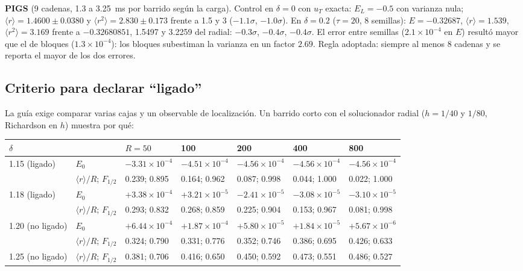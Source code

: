 \documentclass[11pt]{article}
\begin{document}
\textbf{PIGS} (9 cadenas, 1.3 a 3.25~ms por barrido según la carga). Control en $\delta=0$ con $u_T$ exacta: $E_L=-0.5$ con varianza nula; $\langle r\rangle=1.4600\pm0.0380$ y $\langle r^2\rangle=2.830\pm0.173$ frente a 1.5 y 3 ($-1.1\sigma$, $-1.0\sigma$). En $\delta=0.2$ ($\tau=20$, 8 semillas): $E=-0.32687$, $\langle r\rangle=1.539$, $\langle r^2\rangle=3.169$ frente a $-0.32680851$, 1.5497 y 3.2259 del radial: $-0.3\sigma$, $-0.4\sigma$, $-0.4\sigma$. El error entre semillas ($2.1\times10^{-4}$ en $E$) resultó mayor que el de bloques ($1.3\times10^{-4}$): los bloques subestiman la varianza en un factor $2.69$. Regla adoptada: siempre al menos 8 cadenas y se reporta el mayor de los dos errores.

\subsection{Criterio para declarar ``ligado''}
\label{sec:criterio}

La guía exige comparar varias cajas y un observable de localización. Un barrido corto con el solucionador radial ($h=1/40$ y $1/80$, Richardson en $h$) muestra por qué:

\begin{table}[H]
\centering
\small
\begin{tabular}{@{}lllllll@{}}
\toprule
$\delta$ & & $R=50$ & 100 & 200 & 400 & 800\\
\midrule
1.15 (ligado) & $E_0$ & $-3.31\times10^{-4}$ & $-4.51\times10^{-4}$ & $-4.56\times10^{-4}$ & $-4.56\times10^{-4}$ & $-4.56\times10^{-4}$\\
 & $\langle r\rangle/R$; $F_{1/2}$ & 0.239; 0.895 & 0.164; 0.962 & 0.087; 0.998 & 0.044; 1.000 & 0.022; 1.000\\
1.18 (ligado) & $E_0$ & $+3.38\times10^{-4}$ & $+3.21\times10^{-5}$ & $-2.41\times10^{-5}$ & $-3.08\times10^{-5}$ & $-3.10\times10^{-5}$\\
 & $\langle r\rangle/R$; $F_{1/2}$ & 0.293; 0.832 & 0.268; 0.859 & 0.225; 0.904 & 0.153; 0.967 & 0.081; 0.998\\
1.20 (no ligado) & $E_0$ & $+6.44\times10^{-4}$ & $+1.87\times10^{-4}$ & $+5.80\times10^{-5}$ & $+1.84\times10^{-5}$ & $+5.67\times10^{-6}$\\
 & $\langle r\rangle/R$; $F_{1/2}$ & 0.324; 0.790 & 0.331; 0.776 & 0.352; 0.746 & 0.386; 0.695 & 0.426; 0.633\\
1.25 (no ligado) & $\langle r\rangle/R$; $F_{1/2}$ & 0.381; 0.706 & 0.416; 0.650 & 0.450; 0.592 & 0.473; 0.551 & 0.486; 0.527\\
\bottomrule
\end{tabular}
\end{table}
\end{document}
